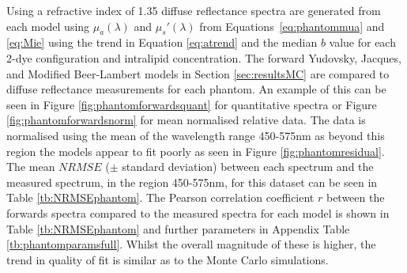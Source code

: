 Using a refractive index of 1.35\cite{Pogue2006} diffuse reflectance spectra are generated from each model using $\mu_a(\lambda)$ and $\mu_s'(\lambda)$ from Equations~\eqref{eq:phantommua} and \eqref{eq:Mie} using the trend in Equation \eqref{eq:atrend} and the median $b$ value for each 2-dye configuration and intralipid concentration. The forward Yudovsky, Jacques, and Modified Beer-Lambert models in Section \ref{sec:resultsMC} are compared to diffuse reflectance measurements for each phantom.
An example of this can be seen in Figure \ref{fig:phantomforwardsquant} for quantitative spectra or Figure \ref{fig:phantomforwardsnorm} for mean normalised relative data.
The data is normalised using the mean of the wavelength range 450-575nm as beyond this region the models appear to fit poorly as seen in Figure \ref{fig:phantomresidual}. 
The mean $NRMSE$ ($\pm$ standard deviation) between each spectrum and the measured spectrum, in the region 450-575nm, for this dataset can be seen in Table \ref{tb:NRMSEphantom}. 
The Pearson correlation coefficient $r$ between the forwards spectra compared to the measured spectra for each model is shown in Table \ref{tb:NRMSEphantom} and further parameters in Appendix Table \ref{tb:phantomparamsfull}. Whilst the overall magnitude of these is higher, the trend in quality of fit is similar as to the Monte Carlo simulations. 

